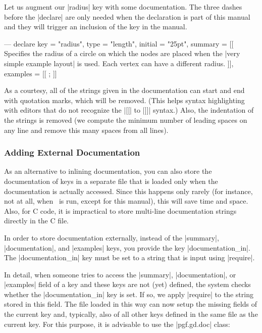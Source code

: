 Let us augment our |radius| key with some documentation. The three dashes
before the |declare| are only needed when the declaration is part of this
manual and they will trigger an inclusion of the key in the manual.
%
\begin{codeexample}[code only, tikz syntax=false]
---
declare {
  key = "radius",
  type = "length",
  initial = "25pt",
  summary = [[
    Specifies the radius of a circle on which the nodes are placed when
    the |very simple example layout| is used. Each vertex can have a
    different radius.
  ]],
  examples = [[
    \tikz {};
  ]]
}
\end{codeexample}

As a courtesy, all of the strings given in the documentation can start and end
with quotation marks, which will be removed. (This helps syntax highlighting
with editors that do not recognize the |[[| to |]]| syntax.) Also, the
indentation of the strings is removed (we compute the minimum number of leading
spaces on any line and remove this many spaces from all lines).


\subsubsection{Adding External Documentation}
\label{section-gd-documentation-in}

As an alternative to inlining documentation, you can also store the
documentation of keys in a separate file that is loaded only when the
documentation is actually accessed. Since this happens only rarely (for
instance, not at all, when \tikzname\ is run, except for this manual), this
will save time and space. Also, for C code, it is impractical to store
multi-line documentation strings directly in the C file.

In order to store documentation externally, instead of the |summary|,
|documentation|, and |examples| keys, you provide the key |documentation_in|.
The |documentation_in| key must be set to a string that is input using
|require|.

In detail, when someone tries to access the |summary|, |documentation|, or
|examples| field of a key and these keys are not (yet) defined, the system
checks whether the |documentation_in| key is set. If so, we apply |require| to
the string stored in this field. The file loaded in this way can now setup the
missing fields of the current key and, typically, also of all other keys
defined in the same file as the current key. For this purpose, it is advisable
to use the |pgf.gd.doc| class:

